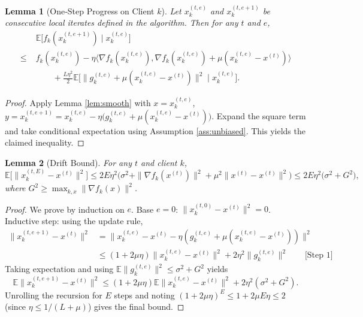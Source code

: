 \documentclass[11pt]{article}
\newtheorem{lemma}{Lemma}
\newcommand{\E}{\mathbb{E}}
\begin{document}
\begin{lemma}[One‑Step Progress on Client $k$]\label{lem:local}
Let $x_{k}^{(t,e)}$ and $x_{k}^{(t,e+1)}$ be consecutive local iterates defined in the algorithm. Then for any $t$ and $e$,
\[
\begin{aligned}
&\E\bigl[f_k(x_{k}^{(t,e+1)})\mid x_{k}^{(t,e)}\bigr] \\
\le\;& f_k(x_{k}^{(t,e)}) - \eta\bigl\langle\nabla f_k(x_{k}^{(t,e)}),\nabla f_k(x_{k}^{(t,e)}) +\mu (x_{k}^{(t,e)}-x^{(t)})\bigr\rangle \\
&\qquad +\frac{L\eta^{2}}{2}\E\bigl[\|g_{k}^{(t,e)}+\mu (x_{k}^{(t,e)}-x^{(t)})\|^{2}\mid x_{k}^{(t,e)}\bigr].
\end{aligned}
\]
\end{lemma}
\begin{proof}
Apply Lemma \ref{lem:smooth} with $x = x_{k}^{(t,e)}$, $y = x_{k}^{(t,e+1)} = x_{k}^{(t,e)}-\eta\bigl(g_{k}^{(t,e)}+\mu (x_{k}^{(t,e)}-x^{(t)})\bigr)$.  Expand the square term and take conditional expectation using Assumption \ref{ass:unbiased}.  This yields the claimed inequality. \qedhere
\end{proof}

\begin{lemma}[Drift Bound]\label{lem:drift}
For any $t$ and client $k$,
\[
\E\bigl[\|x_{k}^{(t,E)}-x^{(t)}\|^{2}\bigr]\le 2E\eta^{2}\bigl(\sigma^{2}+ \|\nabla f_k(x^{(t)})\|^{2}+ \mu^{2}\|x^{(t)}-x^{(t)}\|^{2}\bigr)\le 2E\eta^{2}\bigl(\sigma^{2}+G^{2}\bigr),
\]
where $G^{2}\ge\max_{k,x}\|\nabla f_k(x)\|^{2}$.
\end{lemma}
\begin{proof}
We prove by induction on $e$.  
Base $e=0$: $\|x_{k}^{(t,0)}-x^{(t)}\|^{2}=0$.  
Inductive step: using the update rule,
\[
\begin{aligned}
\|x_{k}^{(t,e+1)}-x^{(t)}\|^{2}
&= \|x_{k}^{(t,e)}-x^{(t)}-\eta(g_{k}^{(t,e)}+\mu(x_{k}^{(t,e)}-x^{(t)}))\|^{2}\\
&\le (1+2\mu\eta)\|x_{k}^{(t,e)}-x^{(t)}\|^{2}+2\eta^{2}\|g_{k}^{(t,e)}\|^{2}  \qquad\text{[Step 1]}
\end{aligned}
\]
Taking expectation and using $\E\|g_{k}^{(t,e)}\|^{2}\le\sigma^{2}+G^{2}$ yields
\[
\E\|x_{k}^{(t,e+1)}-x^{(t)}\|^{2}\le (1+2\mu\eta)\E\|x_{k}^{(t,e)}-x^{(t)}\|^{2}+2\eta^{2}(\sigma^{2}+G^{2}).
\]
Unrolling the recursion for $E$ steps and noting $(1+2\mu\eta)^{E}\le 1+2\mu E\eta\le 2$ (since $\eta\le 1/(L+\mu)$) gives the final bound. \qedhere
\end{proof}
\end{document}
